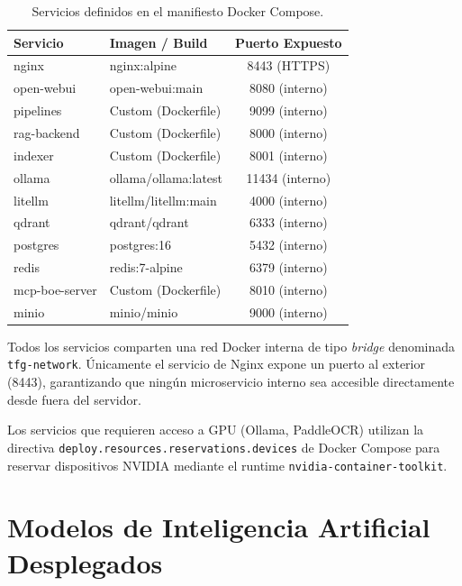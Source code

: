 \begin{table}[H]
\centering
\caption{Servicios definidos en el manifiesto Docker Compose.}
\label{tab:docker-services}
\begin{tabular}{llc}
\toprule
\textbf{Servicio} & \textbf{Imagen / Build} & \textbf{Puerto Expuesto} \\
\midrule
nginx           & nginx:alpine             & 8443 (HTTPS) \\
open-webui      & open-webui:main          & 8080 (interno) \\
pipelines       & Custom (Dockerfile)      & 9099 (interno) \\
rag-backend     & Custom (Dockerfile)      & 8000 (interno) \\
indexer         & Custom (Dockerfile)      & 8001 (interno) \\
ollama          & ollama/ollama:latest     & 11434 (interno) \\
litellm         & litellm/litellm:main     & 4000 (interno) \\
qdrant          & qdrant/qdrant            & 6333 (interno) \\
postgres        & postgres:16              & 5432 (interno) \\
redis           & redis:7-alpine           & 6379 (interno) \\
mcp-boe-server  & Custom (Dockerfile)      & 8010 (interno) \\
minio           & minio/minio              & 9000 (interno) \\
\bottomrule
\end{tabular}
\end{table}

Todos los servicios comparten una red Docker interna de tipo \textit{bridge} denominada \texttt{tfg-network}. Únicamente el servicio de Nginx expone un puerto al exterior (8443), garantizando que ningún microservicio interno sea accesible directamente desde fuera del servidor.

Los servicios que requieren acceso a GPU (Ollama, PaddleOCR) utilizan la directiva \texttt{deploy.resources.reservations.devices} de Docker Compose para reservar dispositivos NVIDIA mediante el runtime \texttt{nvidia-container-toolkit}.

\section{Modelos de Inteligencia Artificial Desplegados}

